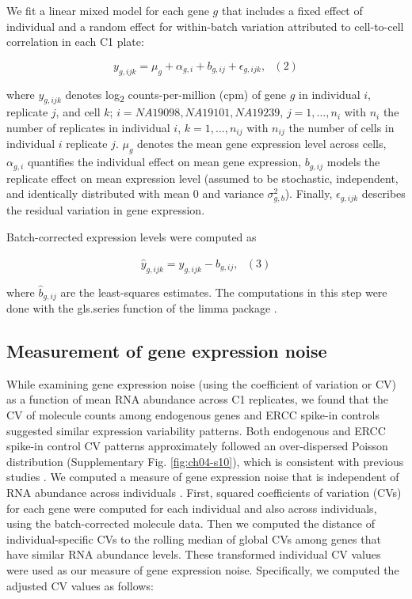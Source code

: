 We fit a linear mixed model for each gene $g$ that includes a fixed
effect of individual and a random effect for within-batch variation
attributed to cell-to-cell correlation in each C1 plate:

\[ y_{g,ijk} = \mu_{g} + \alpha_{g,i} + b_{g,ij} + \epsilon_{g,ijk}, \,\,\,\,(2)\]

where $y_{g,ijk}$ denotes log\textsubscript{2} counts-per-million
(cpm) of gene $g$ in individual $i$, replicate $j$, and cell $k$; $i =
NA19098, NA19101, NA19239$, $j = 1, \dots, n_i$ with $n_i$ the number
of replicates in individual $i$, $k = 1, \dots, n_{ij}$ with $n_{ij}$
the number of cells in individual $i$ replicate $j$. $\mu_g$ denotes
the mean gene expression level across cells, $\alpha_{g,i}$ quantifies
the individual effect on mean gene expression, $b_{g,ij}$ models the
replicate effect on mean expression level (assumed to be stochastic,
independent, and identically distributed with mean 0 and variance
$\sigma^2_{g,b}$). Finally, $\epsilon_{g,ijk}$ describes the residual
variation in gene expression.

Batch-corrected expression levels were computed as

\[ \widehat{y}_{g,ijk} = y_{g,ijk} - \widehat{b}_{g,ij}, \,\,\,\,(3)\]

where $\widehat{b}_{g,ij}$ are the least-squares estimates. The
computations in this step were done with the gls.series function of
the limma package \citep{Ritchie2015}.

\subsection{Measurement of gene expression
noise}\label{measurement-of-gene-expression-noise}

While examining gene expression noise (using the coefficient of
variation or CV) as a function of mean RNA abundance across C1
replicates, we found that the CV of molecule counts among endogenous
genes and ERCC spike-in controls suggested similar expression
variability patterns. Both endogenous and ERCC spike-in control CV
patterns approximately followed an over-dispersed Poisson distribution
(Supplementary Fig. \ref{fig:ch04-s10}), which is consistent with
previous studies \citep{Islam2014, Brennecke2013}. We computed a
measure of gene expression noise that is independent of RNA abundance
across individuals \citep{Kolodziejczyk2015, Newman2006}. First,
squared coefficients of variation (CVs) for each gene were computed
for each individual and also across individuals, using the
batch-corrected molecule data. Then we computed the distance of
individual-specific CVs to the rolling median of global CVs among
genes that have similar RNA abundance levels. These transformed
individual CV values were used as our measure of gene expression
noise. Specifically, we computed the adjusted CV values as follows:

